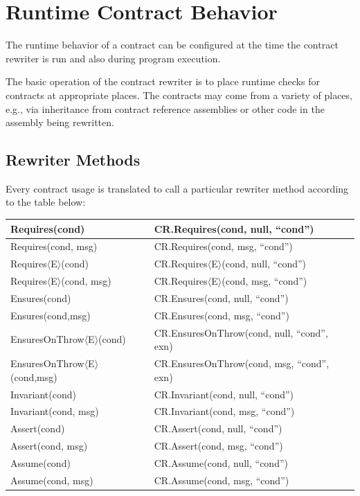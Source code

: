 \documentclass{article}
\newcommand{\requiresn}[1]{{Requires}$\langle$#1$\rangle$}
\newcommand{\EnsuresOnThrow}[1]{{EnsuresOnThrow}$\langle$#1$\rangle$}
\begin{document}
\section{Runtime Contract Behavior}
\label{sec:runtimecontractbehavior}
\label{sec:runtimecontractchecking}

The runtime behavior of a contract can be configured at the time the
contract rewriter is run and also during program execution.

The basic operation of the contract rewriter is to place runtime
checks for contracts at appropriate places. The contracts may come
from a variety of places, e.g., via inheritance from contract
reference assemblies or other code in the assembly being rewritten. 


\subsection{Rewriter Methods}
Every contract usage is translated to call a particular rewriter
method according to the table below:
\begin{center}
\small
\begin{tabular}{|l|l|}
\hline
Requires(cond) & CR.Requires(cond, null, ``cond'') \\
\hline
Requires(cond, msg)&	CR.Requires(cond, msg, ``cond'') \\
\hline
\requiresn{E}(cond) & CR.\requiresn{E}(cond, null, ``cond'') \\
\hline
\requiresn{E}(cond, msg)&	CR.\requiresn{E}(cond, msg, ``cond'') \\
\hline
Ensures(cond)	& CR.Ensures(cond, null, ``cond'') \\
\hline
Ensures(cond,msg)	& CR.Ensures(cond, msg, ``cond'') \\
\hline
\EnsuresOnThrow{E}(cond)	& CR.EnsuresOnThrow(cond, null, ``cond'', exn) \\
\hline
\EnsuresOnThrow{E}(cond,msg)	& CR.EnsuresOnThrow(cond, msg, ``cond'', exn) \\
\hline
Invariant(cond)	& CR.Invariant(cond, null, ``cond'') \\
\hline
Invariant(cond, msg)	&CR.Invariant(cond, msg, ``cond'') \\
\hline
Assert(cond)	&CR.Assert(cond, null, ``cond'') \\
\hline
Assert(cond, msg)	& CR.Assert(cond, msg, ``cond'') \\
\hline
Assume(cond)	& CR.Assume(cond, null, ``cond'') \\
\hline
Assume(cond, msg)	& CR.Assume(cond, msg, ``cond'') \\
\hline
\end{tabular}
\end{center}
\end{document}
